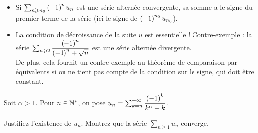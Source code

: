 \begin{rem}
\begin{itemize}
    \item Si \(\sum_{n\geqslant n_0}\left(-1\right)^nu_n\) est une série alternée convergente, sa somme a le signe du premier terme de la série (ici le signe de \(\left(-1\right)^{n_0}u_{n_0}\)). \\
    \item La condition de décroissance de la suite \(u\) est essentielle ! Contre-exemple : la série \(\sum_{n\geqslant2}\dfrac{\left(-1\right)^n}{\left(-1\right)^n+\sqrt{n}}\) est une série alternée divergente. \\ De plus, cela fournit un contre-exemple au théorème de comparaison par équivalents si on ne tient pas compte de la condition sur le signe, qui doit être constant.
\end{itemize}
\end{rem}

\begin{exo}
Soit \(\alpha>1\). Pour \(n\in\mathbb{N}^*\), on pose \(u_n=\sum_{k=n}^{+\infty}\dfrac{\left(-1\right)^k}{k^\alpha+k}\).

Justifiez l'existence de \(u_n\). Montrez que la série \(\sum_{n\geq1}u_n\) converge.
\end{exo}
